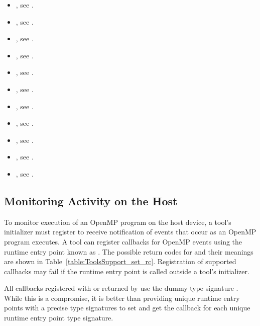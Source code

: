 \crossreferences
\begin{itemize}
\item {}, see .
\item {}, see
  .
\item {}, see .
\item {}, see .
\item {}, see .
\item {}, see .
\item {}, see .
\item {}, see .
\item {}, see .
\item {}, see .
\item {}, see .
\end{itemize}

\subsection{Monitoring Activity on the Host}
\label{sec:ompt-register-callbacks}

To monitor execution of an OpenMP program on the host device, a tool's
initializer must register to receive notification
of events that occur as an OpenMP program executes.  
A tool can register callbacks for OpenMP events using
the runtime entry point known as 
.  The possible return codes for
 and their meanings are shown in
Table~\ref{table:ToolsSupport_set_rc}.  Registration of supported
callbacks may fail if the  runtime entry point is
called outside a tool's initializer.

All callbacks registered with  or returned
by  use the dummy type signature
.  While this is a compromise, it is better
than providing unique runtime entry points with a precise type signatures to
set and get the callback for each unique runtime entry point type signature.

